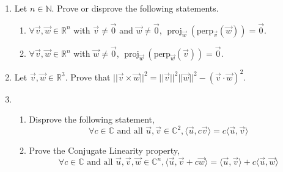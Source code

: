 \documentclass{report}
\newcommand{\C}{{\mathbb{C}}}
\newcommand{\N}{{\mathbb{N}}}
\newcommand{\R}{{\mathbb{R}}}
\newcommand{\proj}{\operatorname{proj}}
\begin{document}
\begin{enumerate}
    \item Let $n \in \N$. Prove or disprove the following statements.
    \begin{enumerate}
        \item $\forall \vec{v}, \vec{w} \in \R^n$ with $\vec{v} \ne \vec{0}$ and $\vec{w} \ne \vec{0}$, $\proj_{\vec{w}}(\text{perp}_{\vec{v}}(\vec{w})) = \vec{0}$.
        \item $\forall \vec{v}, \vec{w} \in \R^n$ with $\vec{w} \ne \vec{0}$, $\proj_{\vec{w}}(\text{perp}_{\vec{w}}(\vec{v})) = \vec{0}$.
    \end{enumerate}
    \item Let $\vec{v}, \vec{w} \in \R^3$. Prove that $||\vec{v} \times \vec{w}||^2 = ||\vec{v}||^2 ||\vec{w}||^2 - (\vec{v} \cdot \vec{w})^2$.
    \item \begin{enumerate}
        \item Disprove the following statement,
        $$ \forall c \in \C \text{ and all } \vec{u}, \vec{v} \in \C^2, \langle \vec{u}, c\vec{v}\rangle = c \langle \vec{u}, \vec{v} \rangle $$
        \item Prove the Conjugate Linearity property,
        $$ \forall c \in \C \text{ and all } \vec{u}, \vec{v}, \vec{w} \in \C^n, \langle \vec{u}, \vec{v} + c \vec{w} \rangle = \langle \vec{u}, \vec{v} \rangle + c \langle \vec{u}, \vec{w} \rangle $$
    \end{enumerate}
\end{enumerate}
\end{document}
